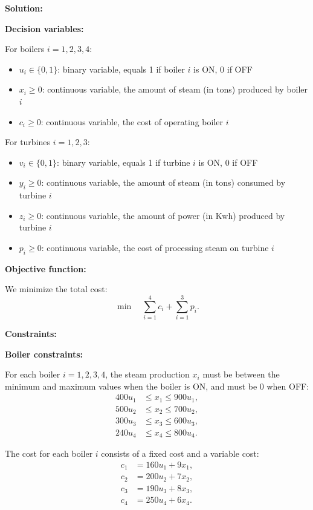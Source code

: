 \documentclass{article}
\begin{document}
\begin{enumerate}
\textbf{Solution:}

\textbf{Decision variables:}

For boilers $i = 1, 2, 3, 4$:
\begin{itemize}
    \item $u_i \in \{0,1\}$: binary variable, equals 1 if boiler $i$ is ON, 0 if OFF
    \item $x_i \geq 0$: continuous variable, the amount of steam (in tons) produced by boiler $i$
    \item $c_i \geq 0$: continuous variable, the cost of operating boiler $i$
\end{itemize}

For turbines $i = 1, 2, 3$:
\begin{itemize}
    \item $v_i \in \{0,1\}$: binary variable, equals 1 if turbine $i$ is ON, 0 if OFF
    \item $y_i \geq 0$: continuous variable, the amount of steam (in tons) consumed by turbine $i$
    \item $z_i \geq 0$: continuous variable, the amount of power (in Kwh) produced by turbine $i$
    \item $p_i \geq 0$: continuous variable, the cost of processing steam on turbine $i$
\end{itemize}

\textbf{Objective function:}

We minimize the total cost:
\[
\min \quad \sum_{i=1}^{4} c_i + \sum_{i=1}^{3} p_i.
\]

\textbf{Constraints:}

\textbf{Boiler constraints:}

For each boiler $i = 1, 2, 3, 4$, the steam production $x_i$ must be between the minimum and maximum values when the boiler is ON, and must be 0 when OFF:
\begin{align*}
400 u_1 &\leq x_1 \leq 900 u_1, \\
500 u_2 &\leq x_2 \leq 700 u_2, \\
300 u_3 &\leq x_3 \leq 600 u_3, \\
240 u_4 &\leq x_4 \leq 800 u_4.
\end{align*}

The cost for each boiler $i$ consists of a fixed cost and a variable cost:
\begin{align*}
c_1 &= 160 u_1 + 9 x_1, \\
c_2 &= 200 u_2 + 7 x_2, \\
c_3 &= 190 u_3 + 8 x_3, \\
c_4 &= 250 u_4 + 6 x_4.
\end{align*}


\end{enumerate}
\end{document}
